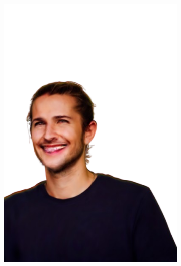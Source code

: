 \begin{figure}[ht]
\begin{subfigure}{0.2\linewidth}
		\includegraphics[width=\textwidth]{Figures/failed/smile/3_render-removebg-preview.png}
	\end{subfigure}
	\begin{subfigure}{0.2\linewidth}

\end{subfigure}
\end{figure}
